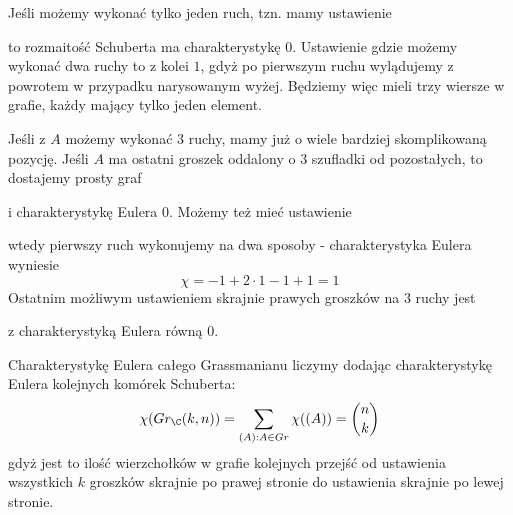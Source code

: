 \begin{enumerate}[label=\textbf{(\alph*)}]
    Jeśli możemy wykonać tylko jeden ruch, tzn. mamy ustawienie
    \begin{center}\end{center} 
    to rozmaitość Schuberta ma charakterystykę $0$. Ustawienie gdzie możemy wykonać dwa ruchy to z kolei $1$, gdyż po pierwszym ruchu wylądujemy z powrotem w przypadku narysowanym wyżej. Będziemy więc mieli trzy wiersze w grafie, każdy mający tylko jeden element.

    Jeśli z $A$ możemy wykonać $3$ ruchy, mamy już o wiele bardziej skomplikowaną pozycję. Jeśli $A$ ma ostatni groszek oddalony o $3$ szufladki od pozostałych, to dostajemy prosty graf
    \begin{center}\end{center}
    i charakterystykę Eulera $0$. Możemy też mieć ustawienie
    \begin{center}\end{center}
    wtedy pierwszy ruch wykonujemy na dwa sposoby - charakterystyka Eulera wyniesie 
    $$\chi=-1+2\cdot 1-1+1=1$$
    Ostatnim możliwym ustawieniem skrajnie prawych groszków na $3$ ruchy jest
    \begin{center}\end{center}
    z charakterystyką Eulera równą $0$.

    Charakterystykę Eulera całego Grassmanianu liczymy dodając charakterystykę Eulera kolejnych komórek Schuberta:
    $$\chi(Gr_{\C}(k,n))=\sum_{\substack{(A):A\in Gr}}\chi((A))=\binom{n}{k}$$
    gdyż jest to ilość wierzchołków w grafie kolejnych przejść od ustawienia wszystkich $k$ groszków skrajnie po prawej stronie do ustawienia skrajnie po lewej stronie.






\end{enumerate}
